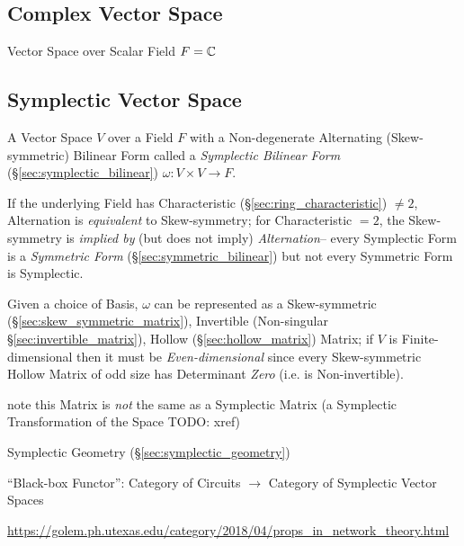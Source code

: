 \subsection{Complex Vector Space}\label{sec:complex_vector_space}

Vector Space over Scalar Field $F = \mathbb{C}$



\subsection{Symplectic Vector Space}\label{sec:symplectic_vectorspace}

A Vector Space $V$ over a Field $F$ with a Non-degenerate Alternating
(Skew-symmetric) Bilinear Form called a \emph{Symplectic Bilinear Form}
(\S\ref{sec:symplectic_bilinear}) $\omega : V \times V \rightarrow F$.

If the underlying Field has Characteristic (\S\ref{sec:ring_characteristic})
$\neq 2$, Alternation is \emph{equivalent} to Skew-symmetry; for Characteristic
$=2$, the Skew-symmetry is \emph{implied by} (but does not imply)
\emph{Alternation}-- every Symplectic Form is a \emph{Symmetric Form}
(\S\ref{sec:symmetric_bilinear}) but not every Symmetric Form is Symplectic.

Given a choice of Basis, $\omega$ can be represented as a Skew-symmetric
(\S\ref{sec:skew_symmetric_matrix}), Invertible (Non-singular
\S\ref{sec:invertible_matrix}), Hollow (\S\ref{sec:hollow_matrix}) Matrix; if
$V$ is Finite-dimensional then it must be \emph{Even-dimensional} since every
Skew-symmetric Hollow Matrix of odd size has Determinant \emph{Zero} (i.e. is
Non-invertible).

note this Matrix is \emph{not} the same as a Symplectic Matrix (a Symplectic
Transformation of the Space TODO: xref)

\fist Symplectic Geometry (\S\ref{sec:symplectic_geometry})

``Black-box Functor'': Category of Circuits $\rightarrow$ Category of
Symplectic Vector Spaces %

\url{https://golem.ph.utexas.edu/category/2018/04/props_in_network_theory.html}

